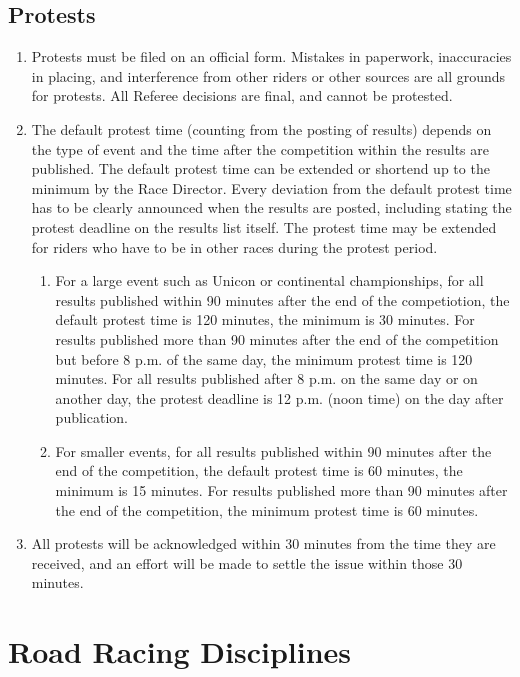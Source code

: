 \subsection{Protests}
	\begin{enumerate}[leftmargin=1.5em,labelsep=*]
		\item Protests must be filed on an official form.
		Mistakes in paperwork, inaccuracies in placing, and interference from other riders or other sources are all grounds for protests. 
        All Referee decisions are final, and cannot be protested.
		\item The default protest time (counting from the posting of results) depends on the type of event and the time after the competition within the results are published.
		The default protest time can be extended or shortend up to the minimum by the Race Director.
		Every deviation from the default protest time has to be clearly announced when the results are posted, including stating the protest deadline on the results list itself.
		The protest time may be extended for riders who have to be in other races during the protest period.
		\begin{enumerate}[label*=\arabic*,leftmargin=1.5em,labelsep=*]
			\item For a large event such as Unicon or continental championships, for all results published within 90 minutes 
            after the end of the competiotion, the default protest time is 120 minutes, the minimum is 30 minutes.
			For results published more than 90 minutes after the end of the competition but before 8 p.m. of the same day, the minimum protest time is 120 minutes.
			For all results published after 8 p.m. on the same day or on another day, the protest deadline is 12 p.m. (noon time) on the day after publication.
			\item For smaller events, for all results published within 90 minutes after the end of the competition, the default protest time is 60 minutes, the minimum is 15 minutes.
			For results published more than 90 minutes after the end of the competition, the minimum protest time is 60 minutes.
		\end{enumerate}
		\item All protests will be acknowledged within 30 minutes from the time they are received, and an effort will be made to settle the issue within those 30 minutes.
	\end{enumerate}

\section{Road Racing Disciplines}

